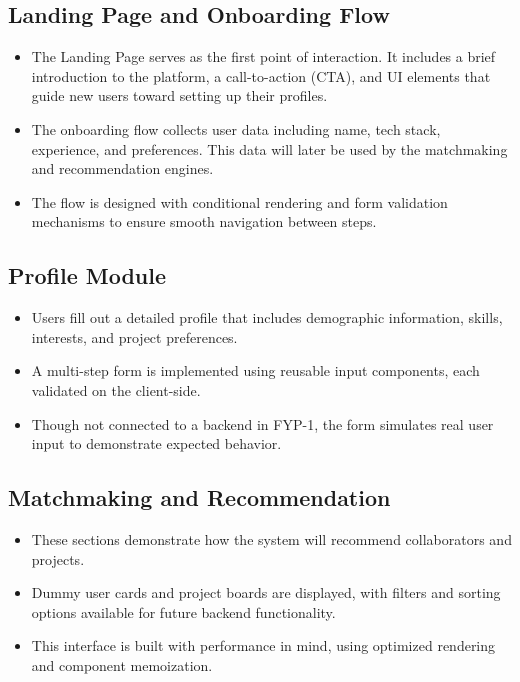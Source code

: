 \documentclass{FastFyp}
\begin{document}
\subsection{Landing Page and Onboarding Flow}
\begin{itemize}
    \item The Landing Page serves as the first point of interaction. It includes a brief introduction to the platform, a call-to-action (CTA), and UI elements that guide new users toward setting up their profiles.
    \item The onboarding flow collects user data including name, tech stack, experience, and preferences. This data will later be used by the matchmaking and recommendation engines.
    \item The flow is designed with conditional rendering and form validation mechanisms to ensure smooth navigation between steps.
\end{itemize}

\subsection{Profile Module}
\begin{itemize}
    \item Users fill out a detailed profile that includes demographic information, skills, interests, and project preferences.
    \item A multi-step form is implemented using reusable input components, each validated on the client-side.
    \item Though not connected to a backend in FYP-1, the form simulates real user input to demonstrate expected behavior.
\end{itemize} 


\subsection{Matchmaking and Recommendation}

\begin{itemize}
    \item These sections demonstrate how the system will recommend collaborators and projects.
    \item Dummy user cards and project boards are displayed, with filters and sorting options available for future backend functionality.
    \item This interface is built with performance in mind, using optimized rendering and component memoization.
\end{itemize}
\end{document}
